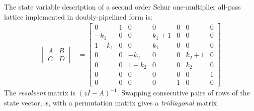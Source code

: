 \documentclass[a4paper,twoside,10pt,english]{article}
\begin{document}
The state variable description of a second order Schur one-multiplier all-pass
lattice implemented in doubly-pipelined form is:
\begin{align*}
  \left[\begin{array}{cc}
    A & B \\
    C & D \end{array}\right] &= \left[\begin{array}{ccccccc}
    0     & 1 &   0     &   0     & 0 &   0     & 0 \\
   -k_{1}  & 0 &   0     & k_{1}+1 & 0 &   0     & 0 \\
  1-k_{1}  & 0 &   0     &   k_{1} & 0 &   0     & 0 \\
    0      & 0 &  -k_{2} &   0     & 0 & k_{2}+1 & 0 \\
    0      & 0 & 1-k_{2} &   0     & 0 &  k_{2}  & 0 \\
    0      & 0 &   0     &   0    &  0 &   0    & 1 \\
    0      & 0 &   0     &   0    &  1 &   0    & 0 \end{array}\right]
\end{align*}
The \emph{resolvent} matrix is $\left(zI-A\right)^{-1}$.
Swapping consecutive pairs of rows of the state vector, $x$, with a permutation
matrix gives a \emph{tridiagonal} matrix
\end{document}
